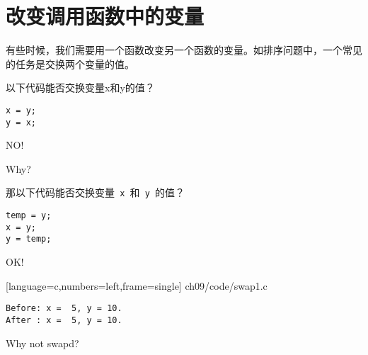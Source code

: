 \section{改变调用函数中的变量}
\begin{frame}[fragile]\ft{\secname}
有些时候，我们需要用一个函数改变另一个函数的变量。如排序问题中，一个常见的任务是交换两个变量的值。
\end{frame}

\begin{frame}[fragile]\ft{\secname}
以下代码能否交换变量x和y的值{\Large ？}
\begin{lstlisting}[backgroundcolor=\color{red!10}]
x = y;
y = x;
\end{lstlisting}
\pause \vspace{0.1in}

\begin{center}
{\Large NO!}
\end{center}
\pause\vspace{0.1in}

\begin{center}
{\Large Why?} 
\end{center}
\end{frame}

\begin{frame}[fragile]\ft{\secname}
那以下代码能否交换变量\lstinline| x |和\lstinline| y |的值{\Large ？}
\begin{lstlisting}[backgroundcolor=\color{red!10}]
temp = y;
x = y;
y = temp;
\end{lstlisting}
\pause \vspace{0.1in}

\begin{center}
{\Large OK!}
\end{center}

\end{frame}

\begin{frame}\ft{\secname}
  
  [language=c,numbers=left,frame=single]
  {ch09/code/swap1.c}
\end{frame}


\begin{frame}[fragile]\ft{\secname}
\begin{lstlisting}[backgroundcolor=\color{red!10}]
Before: x =  5, y = 10.
After : x =  5, y = 10.
\end{lstlisting}
\pause \vspace{0.1in}

\begin{center}
{\Large Why not swapd?}
\end{center}


\end{frame}

